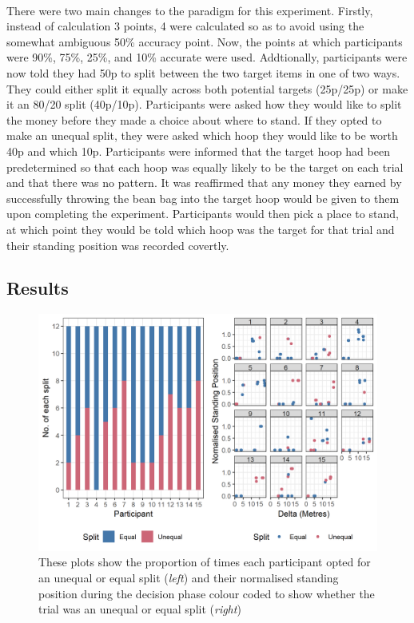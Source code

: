 \documentclass[12pt]{article}
\begin{document}
\paragraph{} There were two main changes to the paradigm for this experiment. Firstly, instead of calculation 3 points, 4 were calculated so as to avoid using the somewhat ambiguous 50\% accuracy point. Now, the points at which participants were 90\%, 75\%, 25\%, and 10\% accurate were used. Addtionally, participants were now told they had 50p to split between the two target items in one of two ways. They could either split it equally across both potential targets (25p/25p) or make it an 80/20 split (40p/10p). Participants were asked how they would like to split the money before they made a choice about where to stand. If they opted to make an unequal split, they were asked which hoop they would like to be worth 40p and which 10p. Participants were informed that the target hoop had been predetermined so that each hoop was equally likely to be the target on each trial and that there was no pattern. It was reaffirmed that any money they earned by successfully throwing the bean bag into the target hoop would be given to them upon completing the experiment. Participants would then pick a place to stand, at which point they would be told which hoop was the target for that trial and their standing position was recorded covertly. 


\subsection*{Results}

\begin{figure}[ht!]%
	\includegraphics[scale=0.9]{Figures/Experiment_5_Unequal_Reward/prop_and_position}
	\centering
	\captionsetup{justification=centering}
	\caption{These plots show the proportion of times each participant opted for an unequal or equal split (\textit{left}) and their normalised standing position during the decision phase colour coded to show whether the trial was an unequal or equal split (\textit{right})}
	\label{fig:DecisionPhase_Reward}
\end{figure}
\end{document}

